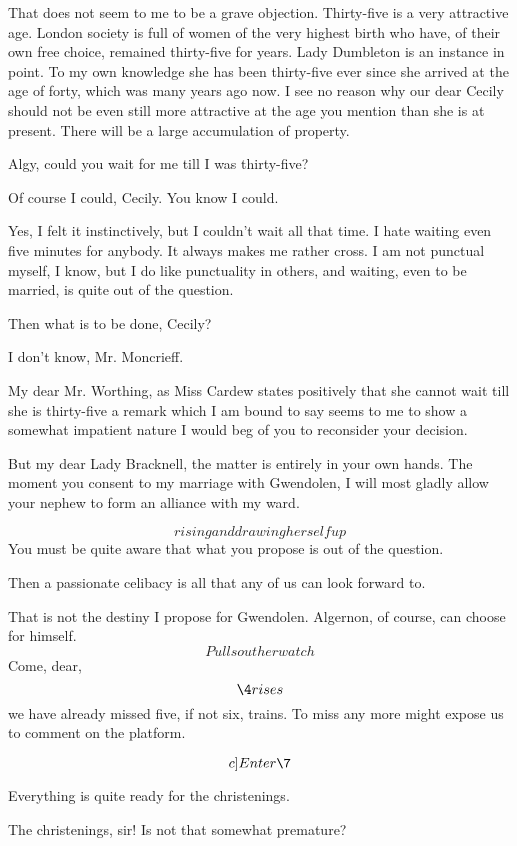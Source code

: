 \documentclass{book}
\begin{document}
\3  That does not seem to me to be a grave objection.
Thirty-five is a very attractive age.  London society is full of
women of the very highest birth who have, of their own free choice,
remained thirty-five for years.  Lady Dumbleton is an instance in
point.  To my own knowledge she has been thirty-five ever since she
arrived at the age of forty, which was many years ago now.  I see
no reason why our dear Cecily should not be even still more
attractive at the age you mention than she is at present.  There
will be a large accumulation of property.

\5  Algy, could you wait for me till I was thirty-five?

\2  Of course I could, Cecily.  You know I could.

\5  Yes, I felt it instinctively, but I couldn't wait all that
time.  I hate waiting even five minutes for anybody.  It always
makes me rather cross.  I am not punctual myself, I know, but I do
like punctuality in others, and waiting, even to be married, is
quite out of the question.

\2  Then what is to be done, Cecily?

\5  I don't know, Mr. Moncrieff.

\3  My dear Mr. Worthing, as Miss Cardew states
positively that she cannot wait till she is thirty-five \textemdash a remark
which I am bound to say seems to me to show a somewhat impatient
nature \textemdash I would beg of you to reconsider your decision.

\1  But my dear Lady Bracknell, the matter is entirely in your
own hands.  The moment you consent to my marriage with Gwendolen, I
will most gladly allow your nephew to form an alliance with my
ward.

\3  \[rising and drawing herself up\]  You must be
quite aware that what you propose is out of the question.

\1  Then a passionate celibacy is all that any of us can look
forward to.

\3  That is not the destiny I propose for Gwendolen.
Algernon, of course, can choose for himself.  \[Pulls out her
watch\]  Come, dear, \[\4 rises\] we have already missed five,
if not six, trains.  To miss any more might expose us to comment on
the platform.

\[c]Enter \7\]

\7  Everything is quite ready for the christenings.

\3  The christenings, sir!  Is not that somewhat
premature?
\end{document}
